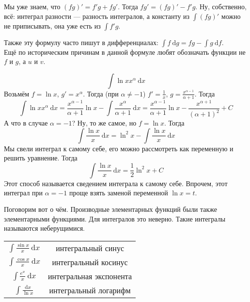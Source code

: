 \documentclass{article}
\begin{document}
\begin{itemize}
\begin{Comment}
        \end{Comment}
        \begin{Proof}
            Мы уже знаем, что $(fg)'=f'g+fg'$. Тогда $fg'=(fg)'-f'g$. Ну, собственно, всё: интеграл разности --- разность интегралов, а константу из $\int(fg)'$ можно не приписывать, она уже есть из $\int f'g$.
        \end{Proof}
        \begin{Comment}
            Также эту формулу часто пишут в дифференциалах: $\int f~\mathrm dg=fg-\int g~\mathrm df$.\\
            Ещё по историческим причинам в данной формуле любят обозначать функции не $f$ и $g$, а $u$ и $v$.
        \end{Comment}
        \begin{Example}
            $$\int\ln xx^\alpha~\mathrm dx$$
            Возьмём $f=\ln x$, $g'=x^\alpha$. Тогда (при $\alpha\neq-1$) $f'=\frac1x$, $g=\frac{x^{\alpha-1}}{\alpha+1}$.
            Тогда
            $$\int\ln xx^\alpha~\mathrm dx=\frac{x^{\alpha-1}}{\alpha+1}\ln x-\int\frac{x^\alpha}{\alpha+1}~\mathrm dx=\frac{x^{\alpha-1}}{\alpha+1}\ln x-\frac{x^{\alpha+1}}{(\alpha+1)^2}+C$$
            А что в случае $\alpha=-1$? Ну, то же самое, но $f=\ln x$. Тогда
            $$\int\frac{\ln x}x~\mathrm dx=\ln^2x-\int\frac{\ln x}x~\mathrm dx$$
            Мы свели интеграл к самому себе, его можно рассмотреть как переменную и решить уравнение. Тогда
            $$\int\frac{\ln x}x~\mathrm dx=\frac12\ln^2x+C$$
            Этот способ называется сведением интеграла к самому себе. Впрочем, этот интеграл при $\alpha=-1$ проще взять заменой переменной $\ln x=t$.
        \end{Example}
        \begin{Comment}
            Поговорим вот о чём. Производные элементарных функций были также элементарными функциями. Для интегралов это неверно. Такие интегралы называются неберущимися.
        \end{Comment}
        \begin{Example}
            \begin{tabular}{|c|c|}
                \hline
                $\int\frac{\sin x}x~\mathrm dx$ & интегральный синус\\
                $\int\frac{\cos x}x~\mathrm dx$ & интегральный косинус\\
                $\int\frac{e^x}x~\mathrm dx$ & интегральная экспонента\\
            $\int\frac{\mathrm dx}{\ln x}$ & интегральный логарифм\\

\end{tabular}
\end{Example}
\end{itemize}
\end{document}
